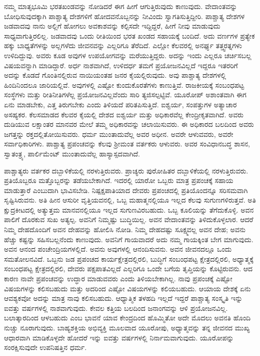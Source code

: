 ನಮ್ಮ ಮಾತೃಭೂಮಿ ಭರತಖಂಡವನ್ನು ನೋಡಿದರೆ ಈಗ ಹೀಗೆ ಆಗುತ್ತಿರುವುದು ಕಾಣುವುದು. ವೇದಾಂತವನ್ನು ಬೋಧಿಸುವುದಕ್ಕಾಗಿ ಪಾಶ್ಚಾತ್ಯ ದೇಶಗಳಿಗೆ ಹೋದವನೊಬ್ಬನನ್ನು ನೀವಿಂದು ಸ್ವಾಗತಿಸುತ್ತಿದ್ದೀರಿ. ಪಾಶ್ಚಾತ್ಯ ದೇಶಗಳ ಜಡವಾದವು ನಾನು ಅಲ್ಲಿಗೆ ಹೋಗಲು ಅವಕಾಶವನ್ನು ಕಲ್ಪಿಸದೇ ಇದ್ದಿದ್ದರೆ, ಹೀಗೆ ನೀವು ಮಾಡುವುದು ಸಾಧ್ಯವಾಗುತ್ತಿರಲಿಲ್ಲ. ಜಡವಾದವು ಒಂದು ರೀತಿಯಿಂದ ಭರತ ಖಂಡದ ಸಹಾಯಕ್ಕೆ ಬಂದಿದೆ. ಅದು ವರ್ಣಗಳ ಪ್ರತ್ಯೇಕ ಹಕ್ಕು ಬಾಧ್ಯತೆಗಳನ್ನು ಅಲ್ಲಗಳೆದು ಜೀವನವನ್ನು ಎಲ್ಲರಿಗೂ ತೆರೆದಿದೆ. ಎಲ್ಲೋ ಕೆಲವರಲ್ಲಿ ಅನರ್ಘ್ಯ ತತ್ತ್ವರತ್ನಗಳು ಉಳಿದಿದ್ದುವು. ಅವರು ಕೂಡ ಅವುಗಳ ಉಪಯೋಗವನ್ನು ಮರೆಯುತ್ತಿದ್ದರು. ಅದನ್ನು ಇಂದು ಎಲ್ಲರೂ ಚರ್ಚಿಸಬಲ್ಲ ವಿಷಯವನ್ನಾಗಿ ಮಾಡಿದ್ದಾರೆ. ಅರ್ಧ ನಾಶವಾಗಿದೆ, ಉಳಿದರ್ಧ ತಮಗೆ ಪ್ರಯೋಜನವಿಲ್ಲದೆ ಇದ್ದರೂ ಇತರರಿಗೆ ಅದನ್ನು ಕೊಡದೆ ಗೊಂತಿನಲ್ಲಿರುವ ನಾಯಿಯಂತಹ ಜನರ ಕೈಯಲ್ಲಿರುವುದು. ಅವು ಪಾಶ್ಚಾತ್ಯ ದೇಶಗಳಲ್ಲಿ ಹಿಂದಿನಿಂದಲೂ ಜಾರಿಯಲ್ಲಿವೆ. ಅವುಗಳಲ್ಲಿ ಎಷ್ಟೋ ಕುಂದುಕೊರತೆಗಳು ಕಾಣುತ್ತಿವೆ. ರಾಜಕೀಯಕ್ಕೆ ಸಂಬಂಧಪಟ್ಟ ಸಂಸ್ಥೆಗಳು ಮತ್ತು ರೀತಿನೀತಿಗಳೆಲ್ಲ ಪ್ರಯೋಜನವಿಲ್ಲವೆಂದು ಸಾರಿ ತ್ಯಜಿಸಲ್ಪಟ್ಟಿವೆ. ಯೂರೋಪ್​ ಅಶಾಂತವಾಗಿ ಈಗ ಏನು ಮಾಡಬೇಕು, ಎತ್ತ ತಿರುಗಬೇಕು ಎಂದು ತಿಳಿಯದೆ ಪರಿತಪಿಸುತ್ತಿದೆ. ಐಶ್ವರ್ಯ, ಸಂಪತ್ತುಗಳ ಅತ್ಯಾಚಾರ ಅಸಹ್ಯಕರ. ಕೆಲಸಮಾಡದ ಕೆಲವರ ಕೈಯಲ್ಲಿ ದೇಶದ ಐಶ್ವರ್ಯ ಮತ್ತು ಅಧಿಕಾರವೆಲ್ಲ ಕೇಂದ್ರೀಕೃತವಾಗಿದೆ. ಅವರು ದುಡಿಯುವ ಲಕ್ಷಾಂತರ ಮಾನವರ ಮೇಲೆ ತಮ್ಮ ಅಧಿಕಾರವನ್ನು ಚಲಾಯಿಸುವರು. ಈ ಅಧಿಕಾರದ ಬಲದಿಂದ ಅವರು ಜಗತ್ತನ್ನು ರಕ್ತದಲ್ಲಿತೋಯಿಸುವರು. ಧರ್ಮ ಮುಂತಾದುವೆಲ್ಲ ಅವರ ಅಧೀನ. ಅವರೇ ಆಳುವವರು, ಅವರೇ ಸರ್ವಾಧಿಕಾರಿಗಳು. ಪಾಶ್ಚಾತ್ಯ ಪ್ರಪಂಚವನ್ನು ಕೆಲವು ಶ‍್ರೀಮಂತ ವರ್ತಕರು ಆಳುವರು. ಅವರ ಸಂವಿಧಾನಬದ್ಧ ಶಾಸನ, ಸ್ವಾತಂತ್ರ್ಯ, ಪಾರ್ಲಿಮೆಂಟ್​ ಮುಂತಾದುವೆಲ್ಲ ಹಾಸ್ಯಾಸ್ಪದವಾಗಿದೆ.

ಪಾಶ್ಚಾತ್ಯರು ವರ್ತಕರ ದಬ್ಬಾಳಿಕೆಯಲ್ಲಿ ನರಳುತ್ತಿರುವರು. ಪ್ರಾಚ್ಯರು ಪುರೋಹಿತರ ದಬ್ಬಾಳಿಕೆಯಲ್ಲಿ ನರಳುತ್ತಿರುವರು. ಪ್ರತಿಯೊಬ್ಬರೂ ಮತ್ತೊಬ್ಬರನ್ನು ತಡೆಯಬೇಕಾಗಿದೆ. ಇದರಲ್ಲಿ ಯಾರೋ ಒಬ್ಬರು ಮಾತ್ರ ಪ್ರಪಂಚಕ್ಕೆ ಸಹಾಯ ಮಾಡುತ್ತಾರೆ ಎಂಬುದಾಗಿ ಭಾವಿಸಬೇಡಿ. ನಿಷ್ಪಕ್ಷಪಾತಿಯಾದ ದೇವರು ಪ್ರಪಂಚದಲ್ಲಿ ಪ್ರತಿಯೊಂದನ್ನೂ ಸರಿಸಮವಾಗಿ ಸೃಷ್ಟಿಸಿರುವನು. ಅತಿ ಹೀನ ಆಸುರೀ ವೃತ್ತಿಯವನಲ್ಲಿ, ಒಬ್ಬ ಮಹಾತ್ಮನಲ್ಲಿಯೂ ಇಲ್ಲದ ಕೆಲವು ಸುಗುಣಗಳಿರುತ್ತವೆ. ಅತಿ ಕ್ಷುದ್ರಕೀಟದಲ್ಲಿ ಅತ್ಯುತ್ತಮ ಮಾನವನಲ್ಲಿಯೂ ಇಲ್ಲದ ಸುಗುಣವಿರಬಹುದು. ಒಬ್ಬ ಕೂಲಿಯನ್ನು ತೆಗೆದುಕೊಳ್ಳಿ. ಅವನ ಪಾಲಿಗೆ ದೊರಕುವ ಸುಖ ಅತ್ಯಲ್ಪ. ಅವನಿಗೆ ನಿಮ್ಮಷ್ಟು ಬುದ್ಧಿಯಿಲ್ಲ. ಅವನ ವೇದಾಂತವನ್ನು ತಿಳಿದುಕೊಳ್ಳಲಾರ. ಆದರೆ ನಿಮ್ಮ ದೇಹದೊಂದಿಗೆ ಅವನ ದೇಹವನ್ನು ಹೋಲಿಸಿ ನೋಡಿ. ನಿಮ್ಮ ದೇಹದಷ್ಟು ಸೂಕ್ಷ್ಮವಲ್ಲ ಅವನ ದೇಹ; ಅವನು ಹೆಚ್ಚು ಕಷ್ಟನ್ನು ಸಹಿಸಬಲ್ಲನೆಂದು ಕಾಣುವುದು. ಅವನಿಗೆ ಗಾಯವಾದರೆ ಅದು ನಮ್ಮ ಗಾಯಕ್ಕಿಂತ ಬೇಗ ಮಾಗುವುದು. ಅವನ ಆನಂದ ಪಂಚೇಂದ್ರಿಯಗಳಲ್ಲಿದೆ. ಅವನು ಅವುಗಳಲ್ಲಿ ಆನಂದಿಸುವನು. ಅವನ ಜೀವನದಲ್ಲೂ ಒಂದು ಸಮತೋಲನವಿದೆ. ಒಬ್ಬನು ಜಡ ಪ್ರಪಂಚದ ಕಾರ್ಯಕ್ಷೇತ್ರದಲ್ಲಿರಲಿ, ಬುದ್ಧಿಗೆ ಸಂಬಂಧಪಟ್ಟ ಕ್ಷೇತ್ರದಲ್ಲಿರಲಿ, ಅಧ್ಯಾತ್ಮಕ್ಕೆ ಸಂಬಂಧಪಟ್ಟ ಕ್ಷೇತ್ರದಲ್ಲಿರಲಿ, ದೇವರು ಪಕ್ಷಪಾತವಿಲ್ಲದೆ ಎಲ್ಲರಿಗೂ ಒಂದೇ ಬಗೆಯ ತೃಪ್ತಿಯನ್ನು ಕೊಟ್ಟಿರುವನು. ಆದ ಕಾರಣ ನಾವೇ ಪ್ರಪಂಚವನ್ನು ಉದ್ಧಾರ ಮಾಡುವವರು ಎಂದು ತಿಳಿಯಬೇಕಾಗಿಲ್ಲ. ನಾವು ಪ್ರಪಂಚಕ್ಕೆ ಎಷ್ಟೋ ವಿಷಯಗಳನ್ನು ಕಲಿಸಬಹುದು ಮತ್ತು ಅದರಿಂದ ಎಷ್ಟೋ ವಿಷಯಗಳನ್ನು ಕಲಿಯಬಹುದು. ಆಯಾಯ ದೇಶಕ್ಕೆ ಏನು ಆವಶ್ಯಕವೋ ಅದನ್ನು ಮಾತ್ರ ನಾವು ಕಲಿಸಬಹುದು. ಆಧ್ಯಾತ್ಮಿಕ ತಳಹದಿ ಇಲ್ಲದೆ ಇದ್ದರೆ ಪಾಶ್ಚಾತ್ಯ ಸಂಸ್ಕೃತಿ ಇನ್ನು ಐವತ್ತು ವರ್ಷಗಳಲ್ಲಿ ನಾಶವಾಗುವುದು. ಕೇವಲ ಕತ್ತಿಯ ಬಲದಿಂದ ಜನಾಂಗವನ್ನು ಆಳಿ ಪ್ರಯೋಜನವಿಲ್ಲ. ಬಲಾತ್ಕಾರದಿಂದ ಆಳಬಹುದು ಎಂಬ ಭಾವನೆ ಯಾವ ಕೇಂದ್ರದಿಂದ ಹೊಮ್ಮಿತೋ ಅದೇ ಮೊದಲು ಅವನತಿ ಹೊಂದಿ ನುಚ್ಚು ನೂರಾಗುವುದು. ಬಾಹ್ಯಶಕ್ತಿಯ ಅಭಿವ್ಯಕ್ತಿ ಮೂಲವಾದ ಯೂರೋಪು, ಅಧ್ಯಾತ್ಮವನ್ನು ತನ್ನ ಜೀವನದ ಮುಖ್ಯ ಆಧಾರವಾಗಿ ಮಾಡಿಕೊಳ್ಳದೇ ಹೋದರೆ ಇನ್ನು ಐವತ್ತು ವರ್ಷಗಳಲ್ಲಿ ನಿರ್ನಾಮವಾಗುವುದು. ಯೂರೋಪನ್ನು ಸಂರಕ್ಷಿಸುವುದೇ ಉಪನಿಷತ್ತಿನ ಧರ್ಮ.

